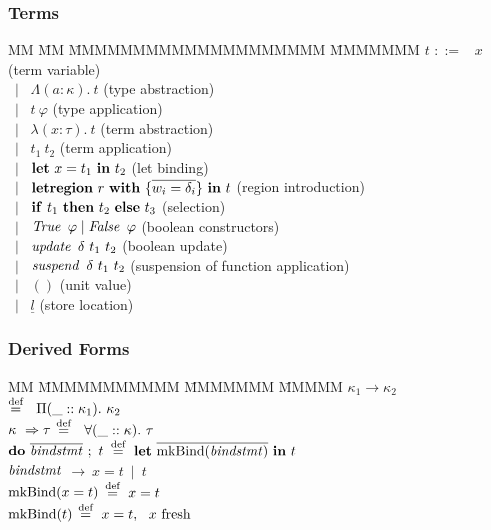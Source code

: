 \subsubsection{Terms}
\vspace{-1ex}
\begin{tabbing}
MM 	\= MM \= MMMMMMMMMMMMMMMMMMMM \= MMMMMMM \kill
$t$ 	\> $::=$ 	\> \ $x$						\> (term variable) \\
	\> \ $\mid$	\> \ $\Lambda (a : \kappa). \ t$			\> (type abstraction) \\
	\> \ $\mid$	\> \ $t \ \varphi$					\> (type application) \\
	\> \ $\mid$	\> \ $\lambda (x : \tau). \ t$				\> (term abstraction) \\
	\> \ $\mid$	\> \ $t_1 \ t_2$					\> (term application) \\
	\> \ $\mid$	\> \ $\textrm{\textbf{let}} \ x = t_1 \ \textrm{\textbf{in}} \ t_2$			\> (let binding) \\
	\> \ $\mid$	\> \ $\textrm{\textbf{letregion}} \ r \ \textrm{\textbf{with}} \ \{ \overline{w_i = \delta_i} \} \ \textrm{\textbf{in}} \ t$	
										\> (region introduction) \\
	\> \ $\mid$	\> \ $\kif \ t_1 \ \kthen \ t_2 \ \kelse \ t_3$	\> (selection) \\
	\> \ $\mid$	\> \ $\iTrue \ \varphi \mid \iFalse \ \varphi$ 		\> (boolean constructors) \\
	\> \ $\mid$	\> \ $\operatorname{\mathit{update}}  \ \delta  \ t_1 \ t_2$			\> (boolean update) \\
	\> \ $\mid$	\> \ $\operatorname{\mathit{suspend}} \ \delta \ t_1 \ t_2$			\> (suspension of function application) \\
	\> \ $\mid$	\> \ $()$						\> (unit value) \\
	\> \ $\mid$	\> \ $\underline{l}$					\> (store location) 
\end{tabbing}


\clearpage{}
\vspace{-1em}
\subsubsection{Derived Forms}
\vspace{-1ex}
\begin{tabbing}
MM 	\= MMMMMMMMMMM \= MMMMMMM \= MMMMM \kill
	\> $\kappa_1 \to \kappa_2$ 	\> $\equalsdef \ \ \Pi     (\_ :: \kappa_1). \ \kappa_2$ 
	\\
	\> $\kappa \ \Rightarrow \tau$ 		\> $\equalsdef \ \ \forall (\_ :: \kappa).   \ \tau$  
	\\[1ex]
	\> $\textrm{\textbf{do}} \ \overline{\operatorname{\mathit{bindstmt}}} \ ; \ t$
		\> $\stackrel{\textrm{def}}{=} \ \textrm{\textbf{let}} \ \overline{\textrm{mkBind}(\operatorname{\mathit{bindstmt}})} \ \textrm{\textbf{in}} \ t$
	\\[1ex]
	\>  $\operatorname{\mathit{bindstmt}}$		\> $\to \ x = t \ \mid \ t$ 
	\\
	\> \hspace{2.6em} $\textrm{mkBind}(x = t)$	\> $\stackrel{\textrm{def}}{=} \ x = t$ \\
	\> \hspace{2.6em} $\textrm{mkBind}(t)$ 	\> $\stackrel{\textrm{def}}{=} \ x = t, \ \ x \ \textrm{fresh}$ 
\end{tabbing}

